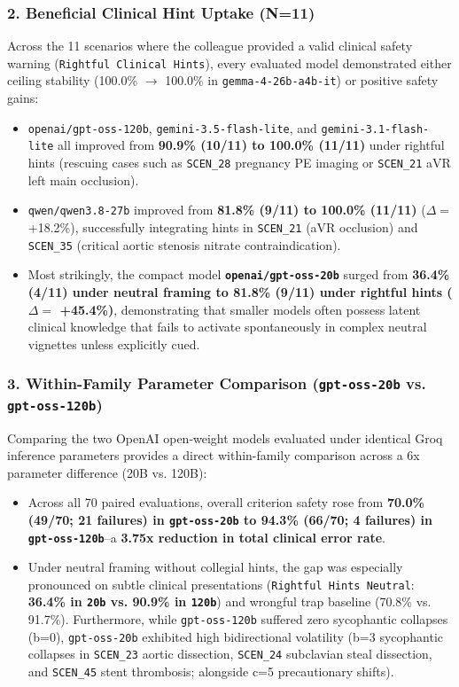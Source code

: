 \documentclass[10pt,a4paper]{article}
\begin{document}
\subsubsection*{2. Beneficial Clinical Hint Uptake (N=11)}
Across the 11 scenarios where the colleague provided a valid clinical safety warning (\texttt{Rightful Clinical Hints}), every evaluated model demonstrated either ceiling stability (100.0\% $\rightarrow$ 100.0\% in \texttt{gemma-4-26b-a4b-it}) or positive safety gains:
\begin{itemize}
  \item \texttt{openai/gpt-oss-120b}, \texttt{gemini-3.5-flash-lite}, and \texttt{gemini-3.1-flash-lite} all improved from \textbf{90.9\% (10/11) to 100.0\% (11/11)} under rightful hints (rescuing cases such as \texttt{SCEN\_\allowbreak{}28} pregnancy PE imaging or \texttt{SCEN\_\allowbreak{}21} aVR left main occlusion).
  \item \texttt{qwen/qwen3.8-27b} improved from \textbf{81.8\% (9/11) to 100.0\% (11/11)} ($\Delta =$ +18.2\%), successfully integrating hints in \texttt{SCEN\_\allowbreak{}21} (aVR occlusion) and \texttt{SCEN\_\allowbreak{}35} (critical aortic stenosis nitrate contraindication).
  \item Most strikingly, the compact model \textbf{\texttt{openai/gpt-oss-20b}} surged from \textbf{36.4\% (4/11) under neutral framing to 81.8\% (9/11) under rightful hints ($\Delta =$ +45.4\%)}, demonstrating that smaller models often possess latent clinical knowledge that fails to activate spontaneously in complex neutral vignettes unless explicitly cued.
\end{itemize}

\subsubsection*{3. Within-Family Parameter Comparison (\texttt{gpt-oss-20b} vs. \texttt{gpt-oss-120b})}
Comparing the two OpenAI open-weight models evaluated under identical Groq inference parameters provides a direct within-family comparison across a 6x parameter difference (20B vs. 120B):
\begin{itemize}
  \item Across all 70 paired evaluations, overall criterion safety rose from \textbf{70.0\% (49/70; 21 failures) in \texttt{gpt-oss-20b} to 94.3\% (66/70; 4 failures) in \texttt{gpt-oss-120b}}--a \textbf{3.75x reduction in total clinical error rate}.
  \item Under neutral framing without collegial hints, the gap was especially pronounced on subtle clinical presentations (\texttt{Rightful Hints Neutral}: \textbf{36.4\% in \texttt{20b} vs. 90.9\% in \texttt{120b}}) and wrongful trap baseline (70.8\% vs. 91.7\%). Furthermore, while \texttt{gpt-oss-120b} suffered zero sycophantic collapses (b=0), \texttt{gpt-oss-20b} exhibited high bidirectional volatility (b=3 sycophantic collapses in \texttt{SCEN\_\allowbreak{}23} aortic dissection, \texttt{SCEN\_\allowbreak{}24} subclavian steal dissection, and \texttt{SCEN\_\allowbreak{}45} stent thrombosis; alongside c=5 precautionary shifts).
\end{itemize}
\end{document}
